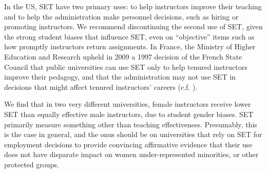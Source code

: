 \documentclass[12pt]{article}
\begin{document}
In the US, SET have two primary uses: 
to help instructors improve their teaching and to help the administration make personnel 
decisions, such as hiring or promoting instructors. 
We recommend discontinuing the second use of SET, given the strong student biases that 
influence SET, even on ``objective'' items such as how promptly instructors return
assignments. 
In France, the Ministry of Higher Education and Research upheld in 2009 a 1997 
decision of the French State Council that public universities can use SET only to help 
tenured instructors improve their pedagogy, and that the administration may not use 
SET in decisions that might affect  tenured instructors' careers (c.f. \citet{Boring2015ofce}). 

We find that in two very different universities, female instructors receive lower SET 
than equally effective male instructors, due to student gender biases. 
SET primarily measure something other than teaching effectiveness.
Presumably, this is the case in general, and the onus should be on universities 
that rely on SET for employment decisions to provide convincing affirmative evidence
that their use does not have disparate impact on women
under-represented minorities, or other protected groups.



\end{document}
